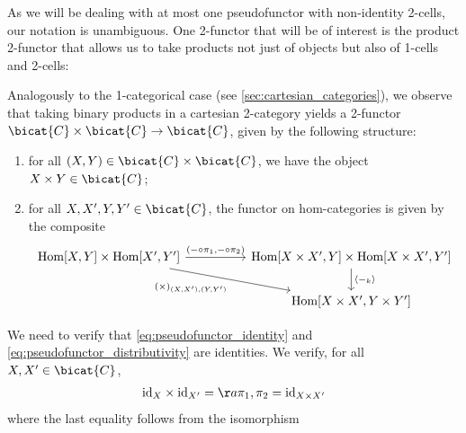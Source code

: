 As we will be dealing with at most one pseudofunctor with non-identity 2-cells, our
notation is unambiguous. One 2-functor that will be of interest is the product 2-functor
that allows us to take products not just of objects but also of 1-cells and 2-cells:

\begin{example}\label{ex:product_2functor}
  Analogously to the 1-categorical case (see \ref{sec:cartesian_categories}),
  we observe that taking binary products in a cartesian 2-category yields a
  2-functor $\bicat{C}\times\bicat{C}\to\bicat{C}$, given by the following
  structure:
  \begin{enumerate}
    \item for all $(X,Y)\in\bicat{C}\times\bicat{C}$, we have the object $X\times Y\in\bicat{C}$;
    \item for all $X,X',Y,Y'\in\bicat{C}$, the functor on hom-categories is given
      by the composite
      \begin{equation}
        \begin{tikzcd}
          {\text{Hom}[X,Y]\times\text{Hom}[X',Y']} && {\text{Hom}[X\times X',Y]\times\text{Hom}[X\times X',Y']} \\
                                                   && {\text{Hom}[X\times X',Y\times Y']}
                                                   \arrow["{\langle-_k\rangle}", from=1-3, to=2-3]
                                                   \arrow["{(-\circ\pi_1,-\circ\pi_2)}", from=1-1, to=1-3]
                                                   \arrow["{(\times)_{(X,X'),(Y,Y')}}"', from=1-1, to=2-3]
        \end{tikzcd}
      \end{equation}
  \end{enumerate}
  We need to verify that \ref{eq:pseudofunctor_identity} and \ref{eq:pseudofunctor_distributivity}
  are identities. We verify, for all $X,X'\in\bicat{C}$,
  \begin{align*}
    \text{id}_X\times \text{id}_{X'} = \aa{\pi_1,\pi_2} = \text{id}_{X\times X'}
  \end{align*}
  where the last equality follows from the isomorphism

\end{example}
